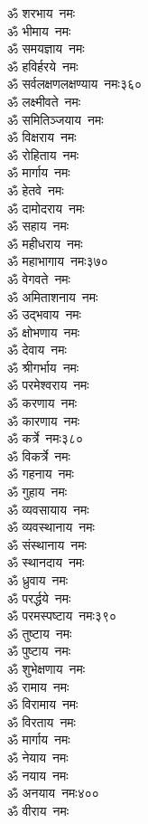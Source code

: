 \begin{multicols}{2}
\begin{flushleft}
ॐ शरभाय~नमः\\
ॐ भीमाय~नमः\\
ॐ समयज्ञाय~नमः\\
ॐ हविर्हरये~नमः\\
ॐ सर्वलक्षणलक्षण्याय~नमः\hfill ३६०\\
ॐ लक्ष्मीवते~नमः\\
ॐ समितिञ्जयाय~नमः\\
ॐ विक्षराय~नमः\\
ॐ रोहिताय~नमः\\
ॐ मार्गाय~नमः\\
ॐ हेतवे~नमः\\
ॐ दामोदराय~नमः\\
ॐ सहाय~नमः\\
ॐ महीधराय~नमः\\
ॐ महाभागाय~नमः\hfill ३७०\\
ॐ वेगवते~नमः\\
ॐ अमिताशनाय~नमः\\
ॐ उद्भवाय~नमः\\
ॐ क्षोभणाय~नमः\\
ॐ देवाय~नमः\\
ॐ श्रीगर्भाय~नमः\\
ॐ परमेश्वराय~नमः\\
ॐ करणाय~नमः\\
ॐ कारणाय~नमः\\
ॐ कर्त्रे~नमः\hfill ३८०\\
ॐ विकर्त्रे~नमः\\
ॐ गहनाय~नमः\\
ॐ गुहाय~नमः\\
ॐ व्यवसायाय~नमः\\
ॐ व्यवस्थानाय~नमः\\
ॐ संस्थानाय~नमः\\
ॐ स्थानदाय~नमः\\
ॐ ध्रुवाय~नमः\\
ॐ परर्द्धये~नमः\\
ॐ परमस्पष्टाय~नमः\hfill ३९०\\
ॐ तुष्टाय~नमः\\
ॐ पुष्टाय~नमः\\
ॐ शुभेक्षणाय~नमः\\
ॐ रामाय~नमः\\
ॐ विरामाय~नमः\\
ॐ विरताय~नमः\\
ॐ मार्गाय~नमः\\
ॐ नेयाय~नमः\\
ॐ नयाय~नमः\\
ॐ अनयाय~नमः\hfill ४००\\
ॐ वीराय~नमः\\

\end{flushleft}
\end{multicols}
